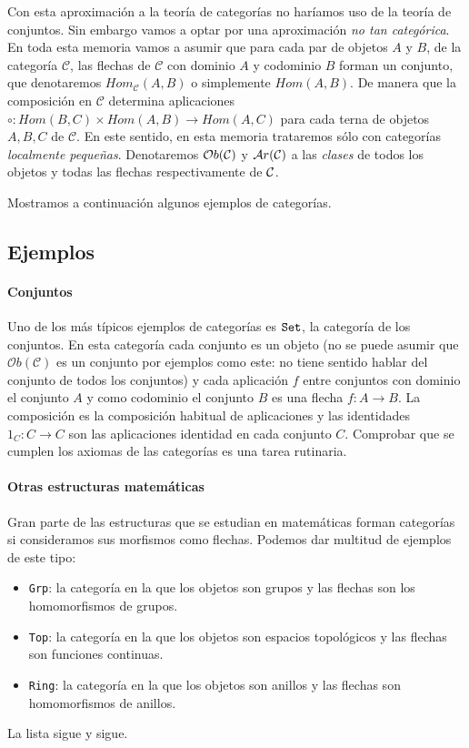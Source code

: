 Con esta aproximación a la teoría de categorías no haríamos uso de la teoría de conjuntos. Sin embargo vamos a optar por una aproximación \emph{no tan categórica}. En toda esta memoria vamos a asumir que para cada par de objetos $A$ y $B$, de la categoría $\mathcal{C}$, las flechas de $\mathcal{C}$ con dominio $A$ y codominio $B$ forman un conjunto, que denotaremos $Hom_{\mathcal{C}}(A,B)$ o simplemente $Hom(A,B)$. De manera que la composición en $\mathcal{C}$ determina aplicaciones $\circ : Hom(B, C)\times Hom(A, B) \rightarrow Hom(A, C)$ para cada terna de objetos $A,B,C$ de $\mathcal{C}$. En este sentido, en esta memoria trataremos sólo con categorías \emph{localmente pequeñas}. Denotaremos $\mathcal{O}b(\mathcal{C})$ y $\mathcal{A}r(\mathcal{C})$ a las \emph{clases} de todos los objetos y todas las flechas respectivamente de $\mathcal{C}$.




Mostramos a continuación algunos ejemplos de categorías.

\subsection{Ejemplos}
\paragraph{Conjuntos}
Uno de los más típicos ejemplos de categorías es $\texttt{Set}$,
la categoría de los conjuntos. En esta categoría
cada conjunto es un objeto (no se puede asumir que
$\mathcal{O}b(\mathcal{C})$ es un conjunto por ejemplos como este:
no tiene sentido hablar del conjunto de todos los conjuntos) y cada
aplicación $f$ entre conjuntos con dominio el conjunto $A$ y como codominio
el conjunto $B$ es una flecha $f : A \longrightarrow B$. La composición
es la composición habitual de aplicaciones y las identidades
$1_C : C \longrightarrow C$ son las aplicaciones identidad en
cada conjunto $C$.
Comprobar que se cumplen los axiomas de las categorías es una tarea
rutinaria.

\paragraph{Otras estructuras matemáticas}
Gran parte de las estructuras que se estudian en matemáticas forman
categorías si consideramos sus morfismos como flechas.
Podemos dar multitud de ejemplos de este tipo:

\begin{itemize}
\item \texttt{Grp}: la categoría en la que los objetos son grupos
  y las flechas son los homomorfismos de grupos.
\item \texttt{Top}: la categoría en la que los objetos son espacios
  topológicos y las flechas son funciones continuas.
\item \texttt{Ring}: la categoría en la que los objetos son
  anillos y las flechas son homomorfismos de anillos.
\end{itemize}
La lista sigue y sigue.

